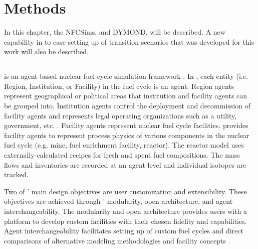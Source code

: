 \chapter{Methods}
\label{chap:3}
In this chapter, the \glspl{NFCSim}, \Cyclus and DYMOND, will 
be described. 
A new capability in \Cyclus to ease setting up 
of transition scenarios that was developed for this work 
will also be described. 

\section{\Cyclus}
\Cyclus is an agent-based nuclear fuel cycle simulation framework 
\cite{huff_fundamental_2016}. 
In \Cyclus, each entity (i.e. Region, Institution, or Facility) in 
the fuel cycle is an agent. 
Region agents represent geographical or political areas that institution
and facility agents can be grouped into. 
Institution agents control the 
deployment and decommission of facility agents 
and represents legal operating organizations such as a 
utility, government, etc. \cite{huff_fundamental_2016}. 
Facility agents represent nuclear fuel cycle facilities. 
\Cycamore \cite{carlsen_cycamore_2014}
provides facility agents to represent process physics of various 
components in the nuclear fuel cycle (e.g. mine, fuel enrichment 
facility, reactor). 
The \Cycamore reactor model uses externally-calculated 
recipes for fresh and spent fuel compositions. 
The mass flows and inventories are recorded at an agent-level
and individual isotopes are tracked. 

Two of \Cyclus' main design objectives are user customization and 
extensibility. 
These objectives are achieved through \Cyclus' modularity, 
open architecture, and agent interchangeability. 
The modularity and open architecture provides users with a 
platform to develop custom facilities with their chosen fidelity 
and capabilities. 
Agent interchangeability facilitates setting up of custom fuel 
cycles and direct comparisons of alternative modeling methodologies 
and facility concepts \cite{huff_fundamental_2016}. 

